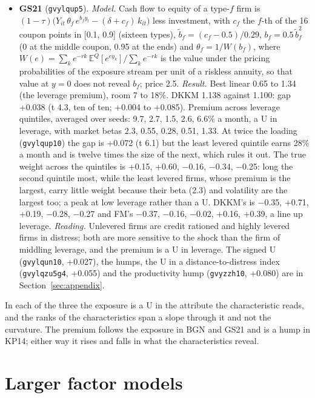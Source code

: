 \documentclass[11pt]{article}
\begin{document}
\begin{itemize}
\item \textbf{GS21} (\texttt{gvylqup5}). \emph{Model.} Cash flow to equity of a type-$f$ firm is $(1-\tau)\big(Y_{it}\,\theta_f\,e^{b_f y_t} - (\delta + c_f)\,k_{it}\big)$ less investment, with $c_f$ the $f$-th of the 16 coupon points in [0.1, 0.9] (sixteen types), $\tilde b_f = (c_f - 0.5)/0.29$, $b_f = 0.5\,\tilde b_f^2$ (0 at the middle coupon, 0.95 at the ends) and $\theta_f = 1/W(b_f)$, where $W(e) = \sum_k e^{-rk}\,\mathbb{E}^Q[e^{e y_k}] / \sum_k e^{-rk}$ is the value under the pricing probabilities of the exposure stream per unit of a riskless annuity, so that value at $y = 0$ does not reveal $b_f$; price 2.5. \emph{Result.} Best linear 0.65 to 1.34 (the leverage premium), room 7 to 18\%. DKKM 1.138 against 1.100: gap +0.038 (t 4.3, ten of ten; +0.004 to +0.085). Premium across leverage quintiles, averaged over seeds: 9.7, 2.7, 1.5, 2.6, 6.6\% a month, a U in leverage, with market betas 2.3, 0.55, 0.28, 0.51, 1.33. At twice the loading (\texttt{gvylqup10}) the gap is +0.072 (t 6.1) but the least levered quintile earns 28\% a month and is twelve times the size of the next, which rules it out. The true weight across the quintiles is +0.15, +0.60, $-$0.16, $-$0.34, $-$0.25: long the second quintile most, while the least levered firms, whose premium is the largest, carry little weight because their beta (2.3) and volatility are the largest too; a peak at low leverage rather than a U. DKKM's is $-$0.35, +0.71, +0.19, $-$0.28, $-$0.27 and FM's $-$0.37, $-$0.16, $-$0.02, +0.16, +0.39, a line up leverage. \emph{Reading.} Unlevered firms are credit rationed and highly levered firms in distress; both are more sensitive to the shock than the firm of middling leverage, and the premium is a U in leverage. The signed U (\texttt{gvylqun10}, +0.027), the humps, the U in a distance-to-distress index (\texttt{gvylqzu5g4}, +0.055) and the productivity hump (\texttt{gvyzzh10}, +0.080) are in Section~\ref{sec:appendix}.
\end{itemize}
In each of the three the exposure is a U in the attribute the characteristic reads, and the ranks of the characteristics span a slope through it and not the curvature. The premium follows the exposure in BGN and GS21 and is a hump in KP14; either way it rises and falls in what the characteristics reveal.

\section{Larger factor models}
\end{document}
